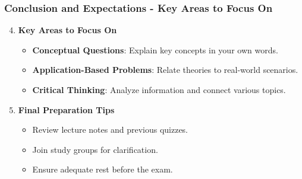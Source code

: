 \documentclass[aspectratio=169]{beamer}
\begin{document}
\begin{frame}[fragile]
    \frametitle{Conclusion and Expectations - Key Areas to Focus On}
    \begin{enumerate}
        \setcounter{enumi}{3} %
        \item \textbf{Key Areas to Focus On}
        \begin{itemize}
            \item \textbf{Conceptual Questions}: Explain key concepts in your own words.
            \item \textbf{Application-Based Problems}: Relate theories to real-world scenarios.
            \item \textbf{Critical Thinking}: Analyze information and connect various topics.
        \end{itemize}

        \item \textbf{Final Preparation Tips}
        \begin{itemize}
            \item Review lecture notes and previous quizzes.
            \item Join study groups for clarification.
            \item Ensure adequate rest before the exam.
        \end{itemize}
    \end{enumerate}
\end{frame}
\end{document}
